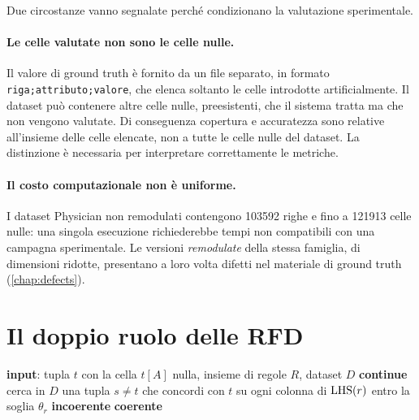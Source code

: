 Due circostanze vanno segnalate perché condizionano la valutazione sperimentale.

\paragraph{Le celle valutate non sono le celle nulle.} Il valore di ground truth è fornito da un
file separato, in formato \texttt{riga;attributo;valore}, che elenca soltanto le celle introdotte
artificialmente. Il dataset può contenere altre celle nulle, preesistenti, che il sistema
tratta ma che non vengono valutate. Di conseguenza copertura e accuratezza sono relative
all'insieme delle celle elencate, non a tutte le celle nulle del dataset. La distinzione è
necessaria per interpretare correttamente le metriche.

\paragraph{Il costo computazionale non è uniforme.} I dataset Physician non remodulati contengono
\num{103592} righe e fino a \num{121913} celle nulle: una singola esecuzione richiederebbe tempi
non compatibili con una campagna sperimentale. Le versioni \emph{remodulate} della stessa
famiglia, di dimensioni ridotte, presentano a loro volta difetti nel materiale di ground truth
(\autoref{chap:defects}).

\section{Il doppio ruolo delle RFD}\label{sec:dual-role}

\begin{algorithm}[htbp]
\caption{Verifica dei veti su una tupla incompleta, ricostruita dal bytecode. Il ciclo esamina
\emph{tutte} le regole dell'insieme e, per ciascuna, scansiona il dataset alla ricerca di un
testimone che violi la soglia di destra.}
\label{alg:veto}
\begin{algorithmic}[1]
\State \textbf{input}: tupla $t$ con la cella $t[A]$ nulla, insieme di regole $R$, dataset $D$
        \State \textbf{continue} 
    \EndIf
    \State cerca in $D$ una tupla $s \neq t$ che concordi con $t$ su ogni colonna di $\mathrm{LHS}(r)$
           entro la soglia $\theta_r$
        \State \Return \textbf{incoerente} 
    \EndIf
\EndFor
\State \Return \textbf{coerente}
\end{algorithmic}
\end{algorithm}

